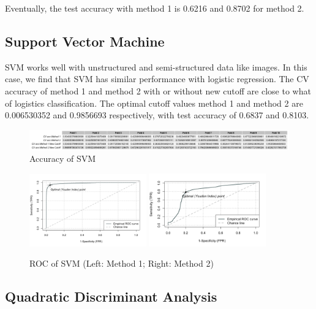 \documentclass[11pt]{article}
\begin{document}
Eventually, the test accuracy with method 1 is 0.6216 and 0.8702 for method 2.

\subsection{Support Vector Machine}

SVM works well with unstructured and semi-structured data like images. In this case, we find that SVM has similar performance with logistic regression. The CV accuracy of method 1 and method 2 with or without new cutoff are close to what of logistics classification. The optimal cutoff values method 1 and method 2 are 0.006530352 and 0.9856693 respectively, with test accuracy of 0.6837 and 0.8103.

\begin{figure}[h]
\includegraphics[width=\textwidth]{3-2-1.png}
\centering
\caption{Accuracy of SVM}
\label{fig:3-2-1}
\centering
\end{figure}

\begin{figure}[h]
\includegraphics[width=0.45\textwidth]{svm_1.JPG}
\includegraphics[width=0.45\textwidth]{svm_2.jpeg}
\caption{ROC of SVM (Left: Method 1; Right: Method 2)}
\label{fig:3-2-2}
\centering
\end{figure}



\subsection{Quadratic Discriminant Analysis}
\end{document}
